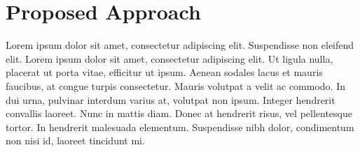 \section{Proposed Approach} \label{sec:approach}
 Lorem ipsum dolor sit amet, consectetur adipiscing elit. Suspendisse non eleifend elit. Lorem ipsum dolor sit amet, consectetur adipiscing elit. Ut ligula nulla, placerat ut porta vitae, efficitur ut ipsum. Aenean sodales lacus et mauris faucibus, at congue turpis consectetur. Mauris volutpat a velit ac commodo. In dui urna, pulvinar interdum varius at, volutpat non ipsum. Integer hendrerit convallis laoreet. Nunc in mattis diam. Donec at hendrerit risus, vel pellentesque tortor. In hendrerit malesuada elementum. Suspendisse nibh dolor, condimentum non nisi id, laoreet tincidunt mi.
 


